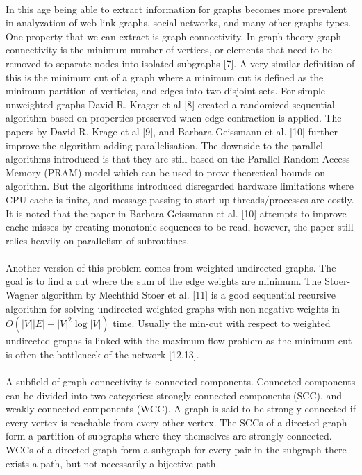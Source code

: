 \documentclass[]{article}
\begin{document}
\paragraph{}
In this age being able to extract information for graphs becomes more prevalent in analyzation of web link graphs, social networks, and many other graphs types. One property that we can extract is graph connectivity. In graph theory graph connectivity is the minimum number of vertices, or elements that need to be removed to separate nodes into isolated subgraphs [7]. A very similar definition of this is the minimum cut of a graph where a minimum cut is defined as the minimum partition of verticies, and edges into two disjoint sets. For simple unweighted graphs David R. Krager et al [8] created a randomized sequential algorithm based on properties preserved when edge contraction is applied. The papers by David R. Krage et al [9], and Barbara Geissmann et al. [10] further improve the algorithm adding parallelisation. The downside to the parallel algorithms introduced is that they are still based on the Parallel Random Access Memory (PRAM) model which can be used to prove theoretical bounds on algorithm. But the algorithms introduced disregarded hardware limitations where CPU cache is finite, and message passing to start up threads/processes are costly. It is noted that the paper in Barbara Geissmann et al. [10] attempts to improve cache misses by creating monotonic sequences to be read, however, the paper still relies heavily on parallelism of
 subroutines.
 
 \paragraph{}
 Another version of this problem comes from weighted undirected graphs. The goal is to find a cut where the sum of the edge weights are minimum. The Stoer-Wagner algorithm by Mechthid Stoer et al. [11]  is a good sequential recursive algorithm for solving undirected weighted graphs with non-negative weights in $O(|V||E|+|V|^2\log|V|)$ time. Usually the min-cut with respect to weighted undirected graphs is linked with the maximum flow problem as the minimum cut is often the bottleneck of the network [12,13].
 
 \paragraph{}
 A subfield of graph connectivity is connected components. Connected components can be divided into two categories: strongly connected components (SCC), and weakly connected components (WCC). A graph is said to be strongly connected if every vertex is reachable from every other vertex. The SCCs of a directed graph form a partition of subgraphs where they themselves are strongly connected. WCCs of a directed graph form a subgraph for every pair in the subgraph there exists a path, but not necessarily a bijective path. 
 
\end{document}
